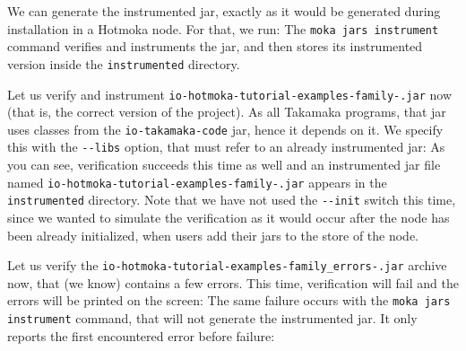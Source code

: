We can generate the instrumented jar, exactly as it would be generated during
installation in a Hotmoka node. For that, we run:
%
%
The \texttt{moka jars instrument} command verifies and instruments the jar, and then stores
its instrumented version inside the \texttt{instrumented} directory.

Let us verify and instrument \texttt{io-hotmoka-tutorial-examples-family-\hotmokaVersion{}.jar} now
(that is, the correct version of the project).
As all Takamaka programs, that jar uses classes from the \texttt{io-takamaka-code} jar,
hence it depends on it. We specify this with the \texttt{-{}-libs} option, that must
refer to an already instrumented jar:
%
%
As you can see, verification succeeds this time as well and an instrumented jar file named
\texttt{io-hotmoka-tutorial-examples-family-\hotmokaVersion{}.jar} appears in the
\texttt{instrumented} directory. Note that we have not used the \texttt{-{}-init}
switch this time, since we wanted to simulate the verification
as it would occur after the node has been already initialized,
when users add their jars to the store of the node.

Let us verify the \texttt{io-hotmoka-tutorial-examples-family\_errors-\hotmokaVersion{}.jar} archive now, that
(we know) contains a few errors. This time, verification will fail and the errors will
be printed on the screen:
%
%
The same failure occurs with the \texttt{moka jars instrument} command,
that will not generate the instrumented jar. It only
reports the first encountered error before failure:
%
